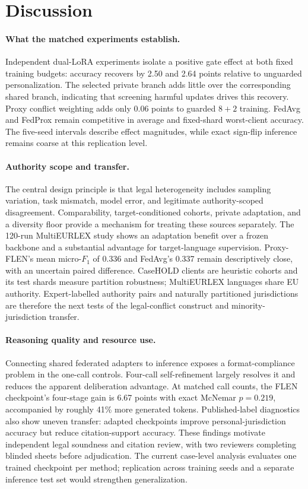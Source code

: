 \documentclass[a4paper,fleqn]{cas-sc}
\begin{document}
\section{Discussion}

\paragraph{What the matched experiments establish.}
Independent dual-LoRA experiments isolate a positive gate effect at both fixed training budgets: accuracy recovers by 2.50 and 2.64 points relative to unguarded personalization. The selected private branch adds little over the corresponding shared branch, indicating that screening harmful updates drives this recovery. Proxy conflict weighting adds only 0.06 points to guarded $8+2$ training. FedAvg and FedProx remain competitive in average and fixed-shard worst-client accuracy. The five-seed intervals describe effect magnitudes, while exact sign-flip inference remains coarse at this replication level.

\paragraph{Authority scope and transfer.}
The central design principle is that legal heterogeneity includes sampling variation, task mismatch, model error, and legitimate authority-scoped disagreement. Comparability, target-conditioned cohorts, private adaptation, and a diversity floor provide a mechanism for treating these sources separately. The 120-run MultiEURLEX study shows an adaptation benefit over a frozen backbone and a substantial advantage for target-language supervision. Proxy-FLEN's mean micro-$F_1$ of 0.336 and FedAvg's 0.337 remain descriptively close, with an uncertain paired difference. CaseHOLD clients are heuristic cohorts and its test shards measure partition robustness; MultiEURLEX languages share EU authority. Expert-labelled authority pairs and naturally partitioned jurisdictions are therefore the next tests of the legal-conflict construct and minority-jurisdiction transfer.

\paragraph{Reasoning quality and resource use.}
Connecting shared federated adapters to inference exposes a format-compliance problem in the one-call controls. Four-call self-refinement largely resolves it and reduces the apparent deliberation advantage. At matched call counts, the FLEN checkpoint's four-stage gain is 6.67 points with exact McNemar $p=0.219$, accompanied by roughly 41\% more generated tokens. Published-label diagnostics also show uneven transfer: adapted checkpoints improve personal-jurisdiction accuracy but reduce citation-support accuracy. These findings motivate independent legal soundness and citation review, with two reviewers completing blinded sheets before adjudication. The current case-level analysis evaluates one trained checkpoint per method; replication across training seeds and a separate inference test set would strengthen generalization.
\end{document}
